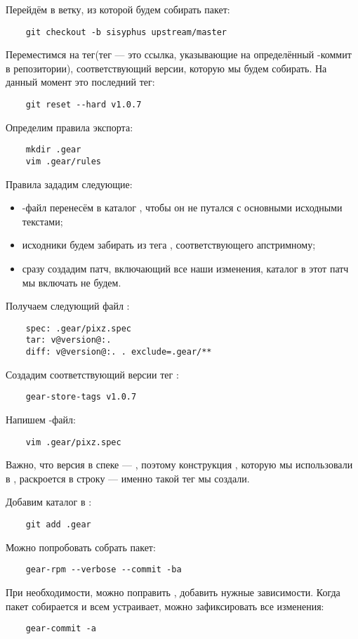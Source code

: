 Перейдём в ветку, из которой будем собирать пакет: 
\begin{verbatim}
	git checkout -b sisyphus upstream/master
\end{verbatim}

Переместимся на тег(тег --- это ссылка, указывающие на определённый -коммит в репозитории), 
соответствующий версии, которую мы будем собирать. На данный момент это последний тег: 
\begin{verbatim}
	git reset --hard v1.0.7
\end{verbatim}

Определим правила экспорта: 
\begin{verbatim}
	mkdir .gear
	vim .gear/rules
\end{verbatim}

Правила зададим следующие: 
\begin{itemize}
	\item {}-файл перенесём в каталог , чтобы он не путался с основными исходными текстами;
	\item исходники будем забирать из тега , соответствующего апстримному;
	\item сразу создадим патч, включающий все наши изменения, каталог  в этот патч мы включать не будем.
\end{itemize}

Получаем следующий файл :
\begin{verbatim}
	spec: .gear/pixz.spec
	tar: v@version@:.
	diff: v@version@:. . exclude=.gear/**
\end{verbatim}

Создадим соответствующий версии тег :
\begin{verbatim}
	gear-store-tags v1.0.7
\end{verbatim} 

Напишем -файл:
\begin{verbatim}
	vim .gear/pixz.spec
\end{verbatim} 

Важно, что версия в спеке --- , поэтому конструкция , 
которую мы использовали в , раскроется в строку  --- 
именно такой тег  мы создали. 

Добавим каталог  в :
\begin{verbatim}
	git add .gear
\end{verbatim} 

Можно попробовать собрать пакет: 
\begin{verbatim}
	gear-rpm --verbose --commit -ba
\end{verbatim}

При необходимости, можно поправить , добавить нужные зависимости. 
Когда пакет собирается и всем устраивает, можно зафиксировать все изменения: 
\begin{verbatim}
	gear-commit -a
\end{verbatim}
